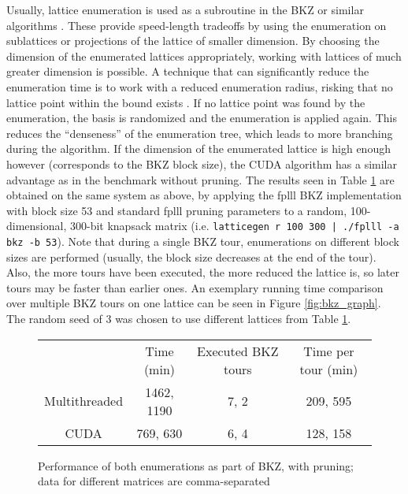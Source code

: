 \documentclass{scrartcl}
\begin{document}
    Usually, lattice enumeration is used as a subroutine in the BKZ or similar algorithms \cite{bkz}. 
    These provide speed-length tradeoffs by using the enumeration on sublattices or projections of the lattice of smaller dimension. 
    By choosing the dimension of the enumerated lattices appropriately, working with lattices of much greater dimension is possible. 
    A technique that can significantly reduce the enumeration time is to work with a reduced enumeration radius, risking that no lattice point within the bound exists \cite{pruning, bkz2}. 
    If no lattice point was found by the enumeration, the basis is randomized and the enumeration is applied again. 
    This reduces the ``denseness'' of the enumeration tree, which leads to more branching during the algorithm. 
    If the dimension of the enumerated lattice is high enough however (corresponds to the BKZ block size), the CUDA algorithm has a similar advantage as in the benchmark without pruning. 
    The results seen in Table \ref{tab:pruning_bench} are obtained on the same system as above, by applying the fplll BKZ implementation with block size 53 and standard fplll pruning parameters to a random, 100-dimensional, 300-bit knapsack matrix (i.e. \texttt{latticegen r 100 300 | ./fplll -a bkz -b 53}). 
    Note that during a single BKZ tour, enumerations on different block sizes are performed (usually, the block size decreases at the end of the tour). 
    Also, the more tours have been executed, the more reduced the lattice is, so later tours may be faster than earlier ones. 
    An exemplary running time comparison over multiple BKZ tours on one lattice can be seen in Figure \ref{fig:bkz_graph}. 
    The random seed of 3 was chosen to use different lattices from Table \ref{tab:pruning_bench}.

    \begin{figure}
        \begin{tabular}{c c c c}
            ~ & Time (min) & Executed BKZ tours & Time per tour (min) \\
            Multithreaded & 1462, 1190 & 7, 2 & 209, 595 \\
            CUDA & 769, 630 & 6, 4 & 128, 158
        \end{tabular}
        \caption{Performance of both enumerations as part of BKZ, with pruning; data for different matrices are comma-separated\label{tab:pruning_bench}}
    \end{figure}
\end{document}
